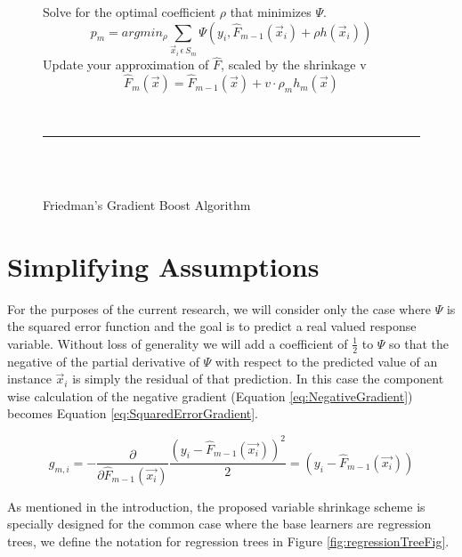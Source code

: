 \documentclass[9pt, conference]{IEEEtran}
\begin{document}
\begin{figure}[t]
\begin{algorithm}[H]
{\begin{equation}
			\end{equation}		
			Solve for the optimal coefficient \(\rho\) that minimizes \(\Psi\).
			\begin{equation}
			p_m = argmin_\rho \sum_{\vec{x}_i \, \epsilon \, S_m}\Psi(y_i, \hat{F}_{m-1}(\vec{x}_i) + \rho h(\vec{x}_i))
			\label{eq:ScalingCoefficent}
			\end{equation}
			Update your approximation of \(\hat{F}\), scaled by the shrinkage v
			\begin{equation}
			\hat{F}_m(\vec{x}) = \hat{F}_{m-1}(\vec{x}) + v  \cdot  \rho_m h_m(\vec{x})
			\label{eq:UpdateStep}
			\end{equation}
		}
		\caption{Friedman's Gradient Boost Algorithm  \cite{2001Friedman} \cite{GBMTut} \cite{2002Friedman} \cite{death2007ABT}}
		\hspace{1 mm} \\\hrule\hspace{1 mm} \\\hspace{1 mm} \\
		\label{alg:GeneralGradientBoost}
	\end{algorithm}

\end{figure}
\section{Simplifying Assumptions}
\label{sec:SimplifyingAssumptions}
For the purposes of the current research, we will consider only the case where \(\Psi\) is the squared error function and the goal is to predict a real valued response variable. Without loss of generality we will add a coefficient of \(\frac{1}{2}\) to \(\Psi\) so that the negative of the partial derivative of \(\Psi\) with respect to the predicted value of an instance \(\vec{x}_i\) is simply the residual of that prediction. In this case the component wise calculation of the negative gradient (Equation \ref{eq:NegativeGradient}) becomes Equation \ref{eq:SquaredErrorGradient}.

\begin{equation}
g_{m,i} = -\frac{\partial}{\partial \hat{F}_{m-1}(\vec{x_i})} \frac{(y_i - \hat{F}_{m-1}(\vec{x_i}))^2}{2} = (y_i - \hat{F}_{m-1}(\vec{x_i}))
\label{eq:SquaredErrorGradient}
\end{equation}

As mentioned in the introduction, the proposed variable shrinkage scheme is specially designed for the common case where the base learners are regression trees, we define the notation for regression trees in Figure \ref{fig:regressionTreeFig}.
\end{document}

